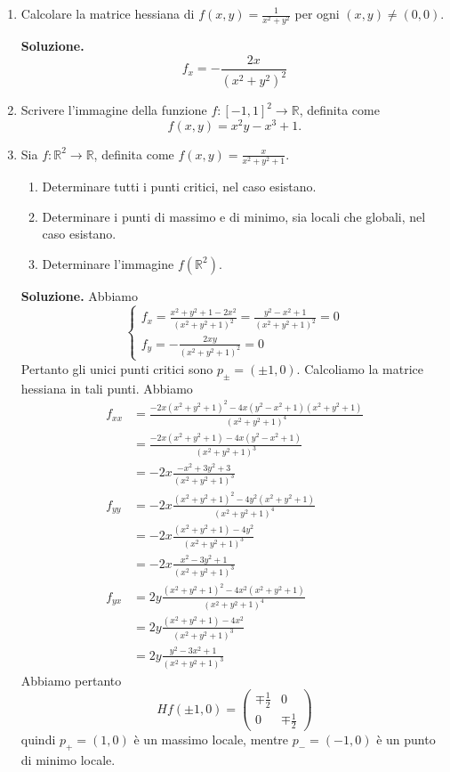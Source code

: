 \begin{enumerate}
	
	\item Calcolare la matrice hessiana di $f(x,y) = \frac{1}{x^2 + y^2}$ per ogni $(x,y) \neq (0,0)$.
	
	\textbf{Soluzione.}
	\[
	f_x = -\frac{2x}{(x^2 + y^2)^2}
	\]
	
	\item Scrivere l'immagine della funzione $f: [-1,1]^2 \to \mathbb{R}$, definita come
	\[
	f(x,y) = x^2 y - x^3 + 1.
	\]
	
	\item Sia $f: \mathbb{R}^2 \to \mathbb{R}$, definita come $f(x,y) = \frac{x}{x^2 + y^2 + 1}$.
	\begin{enumerate}
		\item Determinare tutti i punti critici, nel caso esistano.
		\item Determinare i punti di massimo e di minimo, sia locali che globali, nel caso esistano.
		\item Determinare l'immagine $f(\mathbb{R}^2)$.
	\end{enumerate}
	
	\textbf{Soluzione.}
		Abbiamo
		\[
		\begin{cases}
			f_x = \frac{x^2 + y^2 + 1 - 2x^2}{(x^2 + y^2 + 1)^2} = \frac{y^2 - x^2 + 1}{(x^2 + y^2 + 1)^2} = 0 \\
			f_y = -\frac{2xy}{(x^2 + y^2 + 1)^2} = 0
		\end{cases}
		\]
		Pertanto gli unici punti critici sono $p_{\pm} = (\pm 1, 0)$. Calcoliamo la matrice hessiana in tali punti. Abbiamo
		\[
		\begin{aligned}
			f_{xx} &= \frac{-2x(x^2 + y^2 + 1)^2 - 4x(y^2 - x^2 + 1)(x^2 + y^2 + 1)}{(x^2 + y^2 + 1)^4} \\
			&= \frac{-2x(x^2 + y^2 + 1) - 4x(y^2 - x^2 + 1)}{(x^2 + y^2 + 1)^3} \\
			&= -2x \frac{-x^2 + 3y^2 + 3}{(x^2 + y^2 + 1)^3} \\
			f_{yy} &= -2x \frac{(x^2 + y^2 + 1)^2 - 4y^2(x^2 + y^2 + 1)}{(x^2 + y^2 + 1)^4} \\
			&= -2x \frac{(x^2 + y^2 + 1) - 4y^2}{(x^2 + y^2 + 1)^3} \\
			&= -2x \frac{x^2 - 3y^2 + 1}{(x^2 + y^2 + 1)^3} \\
			f_{yx} &= 2y \frac{(x^2 + y^2 + 1)^2 - 4x^2(x^2 + y^2 + 1)}{(x^2 + y^2 + 1)^4} \\
			&= 2y \frac{(x^2 + y^2 + 1) - 4x^2}{(x^2 + y^2 + 1)^3} \\
			&= 2y \frac{y^2 - 3x^2 + 1}{(x^2 + y^2 + 1)^3}
		\end{aligned}
		\]
		Abbiamo pertanto
		\[
		Hf(\pm 1, 0) = \begin{pmatrix}
			\mp \frac{1}{2} & 0 \\
			0 & \mp \frac{1}{2}
		\end{pmatrix}
		\]
		quindi $p_+ = (1,0)$ è un massimo locale, mentre $p_- = (-1,0)$ è un punto di minimo locale.
		

\end{enumerate}
